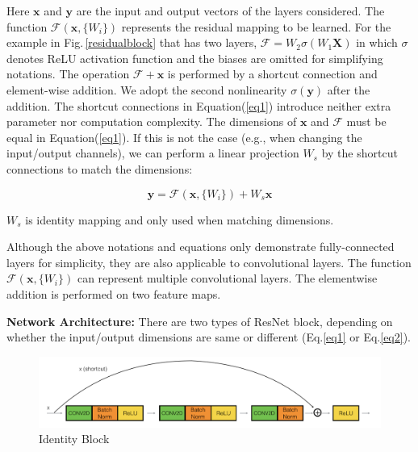 Here $\mathbf{x}$ and $\mathbf{y}$ are the input and output vectors of the layers considered. The function $\mathcal{F} (\mathbf{x}, \{W_i\})$ represents the residual mapping to be learned. For the example in Fig.\,\ref{residualblock} that has two layers, $\mathcal{F}=W_2\sigma(W_1\mathbf{X})$ in which $\sigma$ denotes ReLU activation function and the biases are omitted for simplifying notations. The operation $\mathcal{F} + \mathbf{x}$ is performed by a shortcut connection and element-wise addition. We adopt the second nonlinearity $\sigma(\mathbf{y})$ after the addition. The shortcut connections in Equation(\ref{eq1}) introduce neither extra parameter nor computation complexity. The dimensions of $\mathbf{x}$ and $\mathcal{F}$ must be equal in Equation(\ref{eq1}). If this is not the case (e.g., when changing the input/output channels), we can perform a linear projection $W_s$ by the shortcut connections to match the dimensions: 

\begin{equation} \label{eq2}
\mathbf{y} = \mathcal{F} (\mathbf{x}, \{W_i\}) + W_s \mathbf{x}
\end{equation}

$W_s$ is identity mapping and only used when matching dimensions. 

Although the above notations and equations only demonstrate fully-connected layers for simplicity, they are also applicable to convolutional layers. The function $\mathcal{F} (\mathbf{x}, \{W_i\})$ can represent multiple convolutional layers. The elementwise addition is performed on two feature maps.

\textbf{Network Architecture:}
There are two types of ResNet block, depending on whether the input/output dimensions are same or different (Eq.\ref{eq1} or Eq.\ref{eq2}).

\begin{figure}[h]
	\centering
	\includegraphics[width=\textwidth]{Figs/identityblock.png}
    \caption{Identity Block}
    \label{identityblock}
\end{figure}

